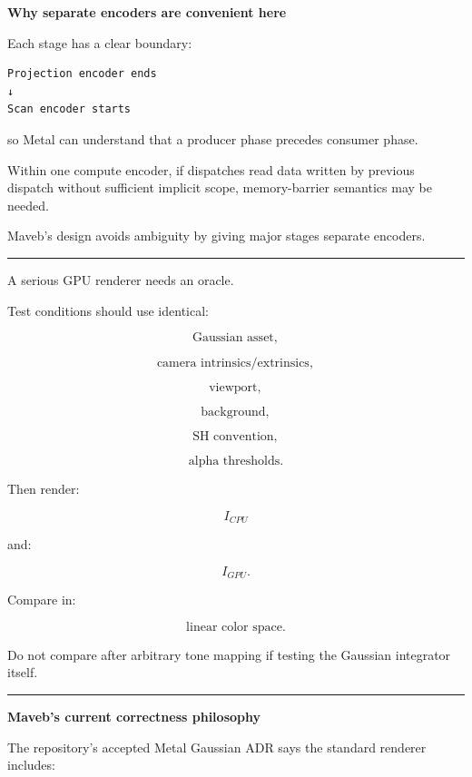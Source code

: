 \textbf{Why separate encoders are convenient here}

Each stage has a clear boundary:

\protect{}\label{9acmg5}%
\begin{verbatim}
Projection encoder ends
↓
Scan encoder starts
\end{verbatim}

so Metal can understand that a producer phase precedes consumer phase.

Within one compute encoder, if dispatches read data written by previous dispatch without sufficient implicit scope, memory-barrier semantics may be needed.

Maveb's design avoids ambiguity by giving major stages separate encoders.

\begin{center}\rule{0.5\linewidth}{0.5pt}\end{center}

A serious GPU renderer needs an oracle.

Test conditions should use identical:

\[
\text{Gaussian asset},
\]

\[
\text{camera intrinsics/extrinsics},
\]

\[
\text{viewport},
\]

\[
\text{background},
\]

\[
\text{SH convention},
\]

\[
\text{alpha thresholds}.
\]

Then render:

\[
I_{CPU}
\]

and:

\[
I_{GPU}.
\]

Compare in:

\[
\boxed{\text{linear color space}.}
\]

Do not compare after arbitrary tone mapping if testing the Gaussian integrator itself.

\begin{center}\rule{0.5\linewidth}{0.5pt}\end{center}

\textbf{Maveb's current correctness philosophy}

The repository's accepted Metal Gaussian ADR says the standard renderer includes:

